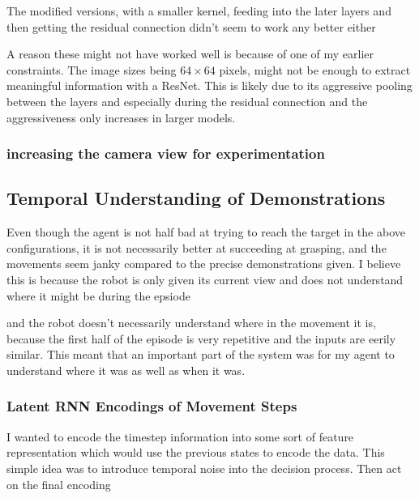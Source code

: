 The modified versions, with a smaller kernel, feeding into the later layers and then getting the residual connection didn't seem to work any better either 

A reason these might not have worked well is because of one of my earlier constraints. The image sizes being \(64 \times 64\) pixels, might not be enough to extract meaningful information with a ResNet. This is likely due to its aggressive pooling between the layers and especially during the residual connection and the aggressiveness only increases in larger models.  

\subsubsection{increasing the camera view for experimentation}

\subsection{Temporal Understanding of Demonstrations}
Even though the agent is not half bad at trying to reach the target in the above configurations, it is not necessarily better at succeeding at grasping, and the movements seem janky compared to the  precise demonstrations given. I believe this is because the robot is only given its current view and does not understand where it might be during the epsiode 

and the robot doesn't necessarily understand where in the movement it is, because the first half of the episode is very repetitive and the inputs are eerily similar. This meant that an important part of the system was for my agent to understand where it was as well as when it was.

\subsubsection{Latent RNN Encodings of Movement Steps}
I wanted to encode the timestep information into some sort of feature representation which would use the previous states to encode the data. This simple idea was to introduce temporal noise into the decision process. Then act on the final encoding


